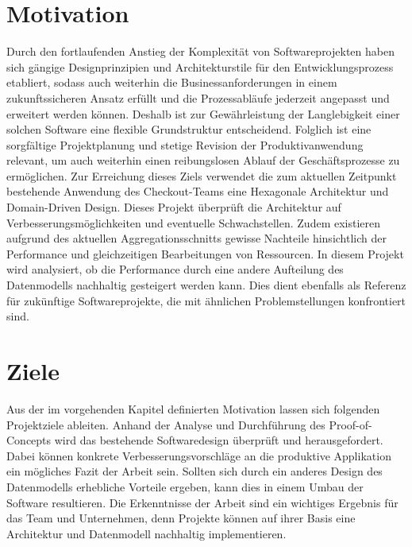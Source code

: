 \pagebreak

\section{Motivation}

Durch den fortlaufenden Anstieg der Komplexität von Softwareprojekten \cite{Darcy.2010} haben sich gängige Designprinzipien und Architekturstile für den Entwicklungsprozess etabliert, sodass auch weiterhin die Businessanforderungen in einem zukunftssicheren Ansatz erfüllt und die Prozessabläufe jederzeit angepasst und erweitert werden können. Deshalb ist zur Gewährleistung der Langlebigkeit einer solchen Software eine flexible Grundstruktur entscheidend. Folglich ist eine sorgfältige Projektplanung und stetige Revision der Produktivanwendung relevant, um auch weiterhin einen reibungslosen Ablauf der Geschäftsprozesse zu ermöglichen. Zur Erreichung dieses Ziels verwendet die zum aktuellen Zeitpunkt bestehende Anwendung des Checkout-Teams eine Hexagonale Architektur und Domain-Driven Design. Dieses Projekt überprüft die Architektur auf Verbesserungsmöglichkeiten und eventuelle Schwachstellen. Zudem existieren aufgrund des aktuellen Aggregationsschnitts gewisse Nachteile hinsichtlich der Performance und gleichzeitigen Bearbeitungen von Ressourcen. In diesem Projekt wird analysiert, ob die Performance durch eine andere Aufteilung des Datenmodells nachhaltig gesteigert werden kann. Dies dient ebenfalls als Referenz für zukünftige Softwareprojekte, die mit ähnlichen Problemstellungen konfrontiert sind.



\section{Ziele}

Aus der im vorgehenden Kapitel definierten Motivation lassen sich folgenden Projektziele ableiten. Anhand der Analyse und Durchführung des Proof-of-Concepts wird das bestehende Softwaredesign überprüft und herausgefordert. Dabei können konkrete Verbesserungsvorschläge an die produktive Applikation ein mögliches Fazit der Arbeit sein. Sollten sich durch ein anderes Design des Datenmodells erhebliche Vorteile ergeben, kann dies in einem Umbau der Software resultieren. Die Erkenntnisse der Arbeit sind ein wichtiges Ergebnis für das Team und Unternehmen, denn Projekte können auf ihrer Basis eine Architektur und Datenmodell nachhaltig implementieren.
